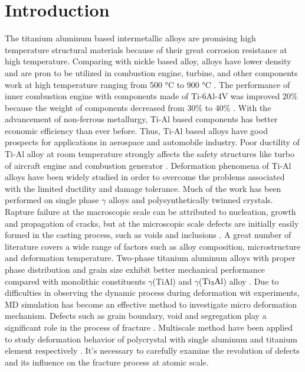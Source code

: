 \documentclass[metals,article,submit,moreauthors,pdftex,10pt,a4paper]{Definitions/mdpi}
\begin{document}
\section{Introduction}
The titanium  aluminum based intermetallic alloys are promising high temperature structural materials because of their great corrosion resistance at high temperature. Comparing with nickle based alloy,  alloys have lower density and are pron to be utilized in combustion engine, turbine, and other components work at high temperature ranging from 500 \si{\degreeCelsius} to 900 \si{\degreeCelsius} \cite{Clemens2016}. The performance of inner combustion engine with components made of Ti-6Al-4V was improved  20\% because the weight of components decreased from 30\% to 40\% \cite{Bewlay2016}. With the advancement of non-ferrous metallurgy, Ti-Al based components has better economic efficiency than ever before. Thus, Ti-Al based alloys have good prospects for applications in aerospace and automobile industry. 
Poor ductility of Ti-Al alloy  at room temperature strongly affects the safety structures like turbo of aircraft engine and combustion generator \cite{Munz2017}. Deformation phenomena of Ti-Al alloys have been widely studied in order to overcome the problems associated with the limited ductility and damage tolerance.  Much of the work has been performed on single phase $\gamma$ alloys and polysynthetically twinned crystals\cite{Appel2016}. Rapture failure at the macroscopic scale can be attributed to nucleation, growth and propagation of cracks, but at the microscopic scale defects are initially easily formed in the casting process, such as voids and inclusions \cite{Tang2014}. A great number of literature covers a wide range of factors such as alloy composition, microstructure and deformation temperature. Two-phase titanium aluminum alloys with proper phase distribution and grain size exhibit better mechanical performance compared with monolithic constituents $\gamma$(TiAl) and $\gamma$($\rm Ti_3Al$) alloy \cite{Kim1995}. Due to difficulties in observing the dynamic process during deformation wit experiments, MD simulation has become an effective method to investigate micro deformation mechanism. Defects such as grain boundary, void and segregation play a significant role in the process of fracture \cite{Larsen2016}. Multiscale method have been applied to study deformation behavior of polycrystal with single aluminum \cite{Groh2009} and titanium element respectively \cite{Liu2018}. It's necessary to carefully examine the revolution of defects and its influence on the fracture process at atomic scale. 
\end{document}
